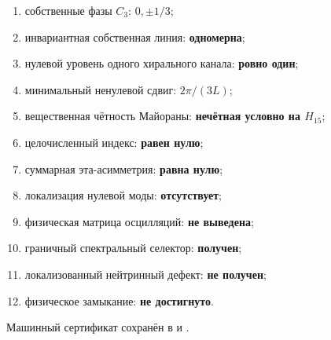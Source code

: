 \begin{protocol}
\begin{enumerate}
 \item собственные фазы $C_3$:
 \textbf{$0,\pm1/3$};
 \item инвариантная собственная линия:
 \textbf{одномерна};
 \item нулевой уровень одного хирального канала:
 \textbf{ровно один};
 \item минимальный ненулевой сдвиг:
 \textbf{$2\pi/(3L)$};
 \item вещественная чётность Майораны:
 \textbf{нечётная условно на $H_{15}$};
 \item целочисленный индекс:
 \textbf{равен нулю};
 \item суммарная эта-асимметрия:
 \textbf{равна нулю};
 \item локализация нулевой моды:
 \textbf{отсутствует};
 \item физическая матрица осцилляций:
 \textbf{не выведена};
 \item граничный спектральный селектор:
 \textbf{получен};
 \item локализованный нейтринный дефект:
 \textbf{не получен};
 \item физическое замыкание:
 \textbf{не достигнуто}.
\end{enumerate}
\end{protocol}

Машинный сертификат сохранён в
 и
.